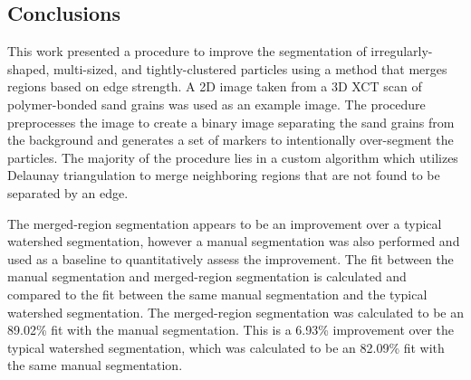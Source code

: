 \subsection{Conclusions}
This work presented a procedure to improve the segmentation of
irregularly-shaped, multi-sized, and tightly-clustered particles
using a method that merges regions based on edge strength.
A 2D image taken from a 3D XCT scan of polymer-bonded sand grains was
used as an example image. The procedure preprocesses the image to
create a binary image separating the sand grains from the background and
generates a set of markers to intentionally over-segment the particles.
The majority of the procedure lies in a custom algorithm which utilizes
Delaunay triangulation to merge neighboring regions that are not found to
be separated by an edge.

The merged-region segmentation appears to be an improvement over a typical
watershed segmentation, however a manual segmentation was also performed
and used as a baseline to quantitatively assess the improvement.
The fit between the manual segmentation and merged-region segmentation is
calculated and compared to the fit between the same manual segmentation
and the typical watershed segmentation.
The merged-region segmentation was calculated to be an 89.02\% fit with
the manual segmentation. This is a 6.93\% improvement over the typical
watershed segmentation, which was calculated to be an 82.09\% fit with the
same manual segmentation.


